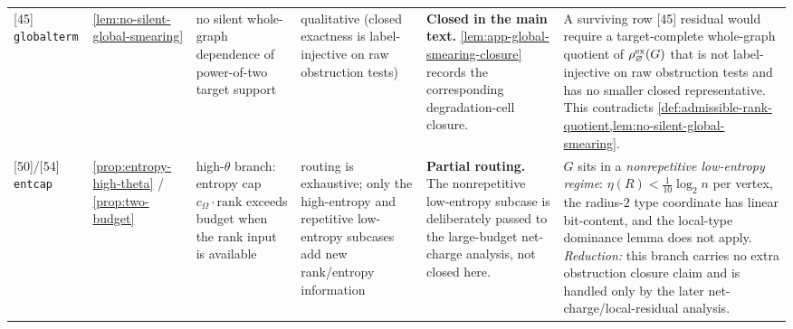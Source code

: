 \documentclass[11pt]{article}
\begin{document}
{\begin{longtable}{L{0.09\textwidth} L{0.095\textwidth} L{0.15\textwidth} L{0.08\textwidth} L{0.105\textwidth} L{0.335\textwidth}}
{[45]} \texttt{globalterm} & \cref{lem:no-silent-global-smearing} & no silent whole-graph dependence of power-of-two target support & qualitative (closed exactness is label-injective on raw obstruction tests) & \textbf{Closed in the main text.} \cref{lem:app-global-smearing-closure} records the corresponding degradation-cell closure. & A surviving row {[45]} residual would require a target-complete whole-graph quotient of $\rho_\varnothing^{\rm ex}(G)$ that is not label-injective on raw obstruction tests and has no smaller closed representative. This contradicts \cref{def:admissible-rank-quotient,lem:no-silent-global-smearing}. \\
{[50]}/{[54]} \texttt{entcap} & \cref{prop:entropy-high-theta} / \cref{prop:two-budget} & high-$\theta$ branch: entropy cap $c_\Omega\cdot\mathrm{rank}$ exceeds budget when the rank input is available & routing is exhaustive; only the high-entropy and repetitive low-entropy subcases add new rank/entropy information & \textbf{Partial routing.} The nonrepetitive low-entropy subcase is deliberately passed to the large-budget net-charge analysis, not closed here. & $G$ sits in a \emph{nonrepetitive low-entropy regime}: $\eta(R)<\tfrac1{10}\log_2 n$ per vertex, the radius-$2$ type coordinate has linear bit-content, and the local-type dominance lemma does not apply.  \emph{Reduction:} this branch carries no extra obstruction closure claim and is handled only by the later net-charge/local-residual analysis. \\
\bottomrule
\end{longtable}
}
\end{document}

